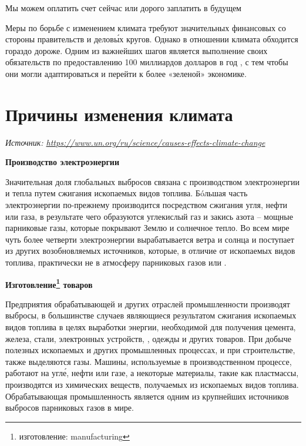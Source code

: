 \begin{fancyquotes}
    Мы можем оплатить счет сейчас или дорого заплатить в будущем
\end{fancyquotes}

Меры по борьбе с изменением климата требуют значительных финансовых  со стороны правительств и делов\'{ы}х кругов. Однако  в отношении климата обходится гораздо дороже. Одним из важнейших шагов является выполнение  своих обязательств по предоставлению 100 миллиардов долларов в год , с тем чтобы они могли адаптироваться и перейти к более «зеленой» экономике.


\newpage
\section{Причины изменения климата}
\textit{Источник: \url{https://www.un.org/ru/science/causes-effects-climate-change}}



\textbf{Производство электроэнергии}

Значительная доля глобальных выбросов связана с производством электроэнергии и тепла путем сжигания ископаемых видов топлива. Бóльшая часть электроэнергии по-прежнему производится посредством сжигания угля, нефти или газа, в результате чего образуются углекислый газ и закись азота – мощные парниковые газы, которые покрывают Землю и  солнечное тепло. Во всем мире чуть более четверти электроэнергии вырабатывается  ветра и солнца и поступает из других возобновляемых источников, которые, в отличие от ископаемых видов топлива, практически не  в атмосферу парниковых газов или .

\textbf{Изготовление\footnote{изготовление: manufacturing} товаров}

Предприятия обрабатывающей и других отраслей промышленности производят выбросы, в большинстве случаев являющиеся результатом сжигания ископаемых видов топлива в целях выработки энергии, необходимой для получения цемента, железа, стали, электронных устройств, , одежды и других товаров.
При добыче полезных ископаемых и других промышленных процессах,  и при строительстве, также выделяются газы. Машины, используемые в производственном процессе,  работают на угл\'{е}, нефти или газе, а некоторые материалы, такие как пластмассы, производятся из химических веществ, получаемых из ископаемых видов топлива. Обрабатывающая промышленность является одним из крупнейших источников выбросов парниковых газов в мире.

